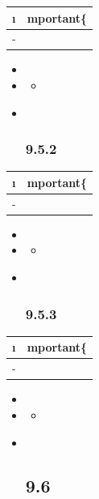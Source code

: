 \begin{longtable}[]{@{}ll@{}}
\toprule\noalign{}
\i & mportant\{} \\
\midrule\noalign{}
\endhead
\bottomrule\noalign{}
\endlastfoot
- & \important{} \\
\end{longtable}

\begin{itemize}
\item
  \important{}
\item
  \begin{itemize}
  \tightlist
  \item
  \end{itemize}
\item ~
  \hypertarget{section-35}{%
  \subsubsection{9.5.2}\label{section-35}}
\end{itemize}

\begin{longtable}[]{@{}ll@{}}
\toprule\noalign{}
\i & mportant\{} \\
\midrule\noalign{}
\endhead
\bottomrule\noalign{}
\endlastfoot
- & \important{} \\
\end{longtable}

\begin{itemize}
\item
  \important{}
\item
  \begin{itemize}
  \tightlist
  \item
  \end{itemize}
\item ~
  \hypertarget{section-36}{%
  \subsubsection{9.5.3}\label{section-36}}
\end{itemize}

\begin{longtable}[]{@{}ll@{}}
\toprule\noalign{}
\i & mportant\{} \\
\midrule\noalign{}
\endhead
\bottomrule\noalign{}
\endlastfoot
- & \important{} \\
\end{longtable}

\begin{itemize}
\item
  \important{}
\item
  \begin{itemize}
  \tightlist
  \item
  \end{itemize}
\item ~
  \hypertarget{section-37}{%
  \subsection{9.6}\label{section-37}}
\end{itemize}

